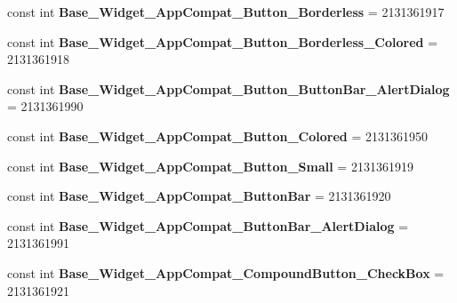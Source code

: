\begin{DoxyCompactItemize}
const int {\bfseries Base\+\_\+\+Widget\+\_\+\+App\+Compat\+\_\+\+Button\+\_\+\+Borderless} = 2131361917
\item 
\mbox{\label{class_sample_app_1_1_droid_1_1_resource_1_1_style_a8f8e198b2586feae02db3c1b0ba56174}} 
const int {\bfseries Base\+\_\+\+Widget\+\_\+\+App\+Compat\+\_\+\+Button\+\_\+\+Borderless\+\_\+\+Colored} = 2131361918
\item 
\mbox{\label{class_sample_app_1_1_droid_1_1_resource_1_1_style_a71220f46c81d5fb1473b59b22f4cafb8}} 
const int {\bfseries Base\+\_\+\+Widget\+\_\+\+App\+Compat\+\_\+\+Button\+\_\+\+Button\+Bar\+\_\+\+Alert\+Dialog} = 2131361990
\item 
\mbox{\label{class_sample_app_1_1_droid_1_1_resource_1_1_style_acd843deed229de0226dc7c898dc5d6e3}} 
const int {\bfseries Base\+\_\+\+Widget\+\_\+\+App\+Compat\+\_\+\+Button\+\_\+\+Colored} = 2131361950
\item 
\mbox{\label{class_sample_app_1_1_droid_1_1_resource_1_1_style_a2fa80bc882ad8779d7e2d47b964b0088}} 
const int {\bfseries Base\+\_\+\+Widget\+\_\+\+App\+Compat\+\_\+\+Button\+\_\+\+Small} = 2131361919
\item 
\mbox{\label{class_sample_app_1_1_droid_1_1_resource_1_1_style_a9de30aff40055a30f5eaa4364d776b1f}} 
const int {\bfseries Base\+\_\+\+Widget\+\_\+\+App\+Compat\+\_\+\+Button\+Bar} = 2131361920
\item 
\mbox{\label{class_sample_app_1_1_droid_1_1_resource_1_1_style_a175acb792a4365872c95fa124c477f56}} 
const int {\bfseries Base\+\_\+\+Widget\+\_\+\+App\+Compat\+\_\+\+Button\+Bar\+\_\+\+Alert\+Dialog} = 2131361991
\item 
\mbox{\label{class_sample_app_1_1_droid_1_1_resource_1_1_style_aeedfb49d91f23fe1e6c6b4075b43ee10}} 
const int {\bfseries Base\+\_\+\+Widget\+\_\+\+App\+Compat\+\_\+\+Compound\+Button\+\_\+\+Check\+Box} = 2131361921
\item 

\end{DoxyCompactItemize}
